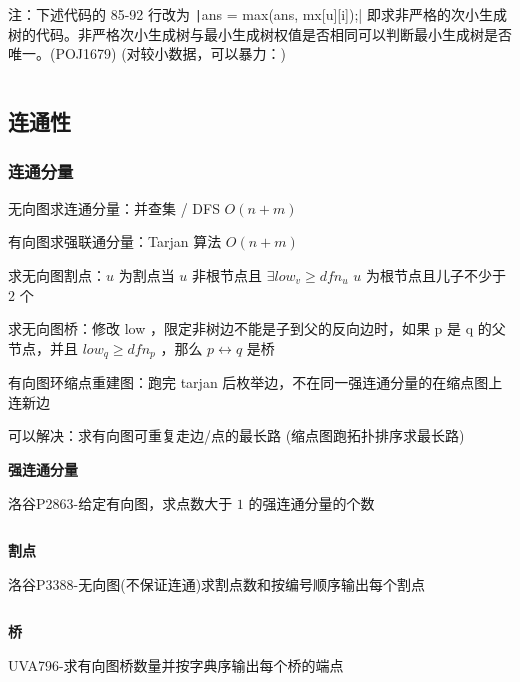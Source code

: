 \documentclass[twocolumn,10pt]{ctexart}
\makeatletter
\newcommand{\cds}[1]{\ding{\numexpr191+#1\relax}}
\newcommand{\hfive}[1]{\par\addvspace{6pt}\@afterindentfalse
  {\noindent\bfseries\normalsize #1}\par\nobreak\vspace{2pt}}
\makeatother
\begin{document}
注：下述代码的 85-92 行改为 \texttt|ans = max(ans, mx[u][i]);| 即求非严格的次小生成树的代码。非严格次小生成树与最小生成树权值是否相同可以判断最小生成树是否唯一。(POJ1679) (对较小数据，可以暴力：)

\begin{notebox}
\inputminted{cpp}{code/poj1679_second_mst.cpp}
\end{notebox}

\subsection{连通性}

\subsubsection{连通分量}

无向图求连通分量：并查集 / DFS $O(n+m)$

有向图求强联通分量：Tarjan 算法  $O(n+m)$

求无向图割点：$u$ 为割点当\cds{1} $u$ 非根节点且 $\exists low_v\ge dfn_u$ \cds{2} $u$ 为根节点且儿子不少于 $2$ 个

求无向图桥：修改 low ，限定非树边不能是子到父的反向边时，如果 p 是 q 的父节点，并且  $low_q\ge dfn_p$ ，那么 $p\leftrightarrow q$ 是桥

有向图环缩点重建图：跑完 tarjan 后枚举边，不在同一强连通分量的在缩点图上连新边

\begin{notebox}
可以解决：求有向图可重复走边/点的最长路 (缩点图跑拓扑排序求最长路)
\end{notebox}

\hfive{强连通分量}

\begin{notebox}
洛谷P2863-给定有向图，求点数大于 $1$ 的强连通分量的个数
\end{notebox}

\inputminted{cpp}{code/ext_044.cpp}

\hfive{割点}

\begin{notebox}
洛谷P3388-无向图(不保证连通)求割点数和按编号顺序输出每个割点
\end{notebox}

\inputminted{cpp}{code/ext_045.cpp}

\hfive{桥}

\begin{notebox}
UVA796-求有向图桥数量并按字典序输出每个桥的端点
\end{notebox}
\end{document}

